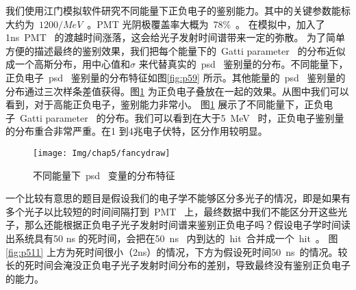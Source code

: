 我们使用江门模拟软件研究不同能量下正负电子的鉴别能力。其中的关键参数能标大约为~$1200/MeV$~。PMT 光阴极覆盖率大概为~78\%~。 在模拟中，加入了1ns~PMT~ 的渡越时间涨落，这会给光子发射时间谱带来一定的弥散。 为了简单方便的描述最终的鉴别效果，我们把每个能量下的~Gatti parameter~ 的分布近似成一个高斯分布，用中心值和$\sigma$ 来代替真实的~psd~ 鉴别量的分布。不同能量下，正负电子~psd~ 鉴别量的分布特征如图\ref{fig:p59} 所示。其他能量的~psd~ 鉴别量的分布通过三次样条差值获得。图\ref{fig:p510} 为正负电子叠放在一起的效果。从图中我们可以看到，对于高能正负电子，鉴别能力非常小。
图\ref{fig:p510} 展示了不同能量下，正负电子~Gatti parameter~ 的分布。我们可以看到在大于5~MeV~ 时，正负电子鉴别量的分布重合非常严重。在1 到4兆电子伏特，区分作用较明显。
\begin{figure}[!htb]
  \centering
   \texttt{[image: Img/chap5/fancydraw]}
    \caption{不同能量下~psd~ 变量的分布特征}
  \label{fig:p510}
\end{figure}
%



一个比较有意思的题目是假设我们的电子学不能够区分多光子的情况，即是如果有多个光子以比较短的时间间隔打到~PMT~ 上，最终数据中我们不能区分开这些光子，那么还能根据正负电子光子发射时间谱来鉴别正负电子吗？假设电子学时间读出系统具有50 ns 的死时间，会把在50~ns~ 内到达的~hit~合并成一个~hit~。 图\ref{fig:p511} 上方为死时间很小（2ns）的情况，下方为假设死时间50~ns~的情况。较长的死时间会淹没正负电子光子发射时间分布的差别，导致最终没有鉴别正负电子的能力。

